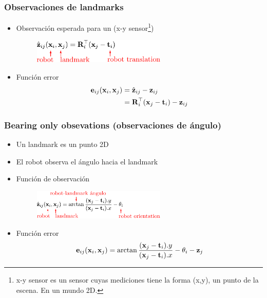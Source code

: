 \begin{frame}
    \frametitle{Observaciones de landmarks}
    
    \begin{itemize}
        \item Observación esperada para un (x-y sensor\footnote{x-y sensor es un sensor cuyas mediciones tiene la forma (x,y), un punto de la escena. En un mundo 2D.})
           \begin{figure}[!h]
            \includegraphics[width=0.6\textwidth]{images/pose_landmark_graph_expected_observation.pdf}
        \end{figure}
    \item Función error
    \begin{align*}
        \boldsymbol{\mathbf{e}}_{ij}(\boldsymbol{\mathbf{x}}_{i}, \boldsymbol{\mathbf{x}}_{j}) &= \hat{\boldsymbol{\mathbf{z}}}_{ij} - \boldsymbol{\mathbf{z}}_{ij}\\
                    &= \boldsymbol{\mathbf{R}}_{i}^{\top}(\boldsymbol{\mathbf{x}}_{j}-\boldsymbol{\mathbf{t}}_{i}) - \boldsymbol{\mathbf{z}}_{ij}
    \end{align*}
    \end{itemize}
    
\end{frame}

\begin{frame}
    \frametitle{Bearing only obsevations (observaciones de ángulo)}
    
    \begin{itemize}
        \item Un landmark es un punto 2D
        \item El robot observa el ángulo hacia el landmark
        \item Función de observación
           \begin{figure}[!h]
            \includegraphics[width=0.6\textwidth]{images/pose_landmark_graph_bearing_observation.pdf}
        \end{figure}
        \item Función error
        \begin{equation*}
            \boldsymbol{\mathbf{e}}_{ij}(\boldsymbol{\mathbf{x}}_{i},\boldsymbol{\mathbf{x}}_{j}) = \arctan{\dfrac{(\boldsymbol{\mathbf{x}}_{j}-\boldsymbol{\mathbf{t}}_{i}).y}{(\boldsymbol{\mathbf{x}}_{j}-\boldsymbol{\mathbf{t}}_{i}).x}} - \theta_{i} - \boldsymbol{\mathbf{z}}_{j}
        \end{equation*}
    \end{itemize}

    
\end{frame}

